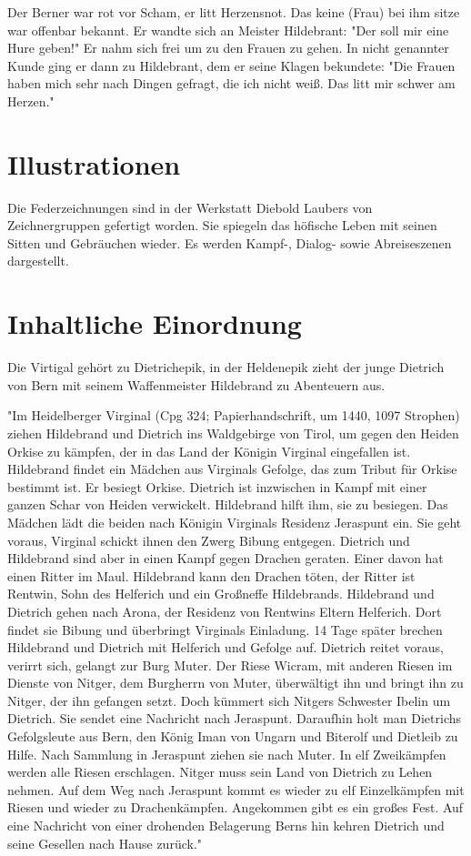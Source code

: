 \documentclass[a4paper, 12pt, oneside]{scrbook}
\begin{document}
Der Berner war rot vor Scham, er litt Herzensnot. Das keine (Frau) bei ihm sitze war offenbar bekannt. Er wandte sich an Meister Hildebrant: "Der soll mir eine Hure geben!" Er nahm sich frei um zu den Frauen zu gehen. In nicht genannter Kunde ging er dann zu Hildebrant, dem er seine Klagen bekundete: "Die Frauen haben mich sehr nach Dingen gefragt, die ich nicht weiß. Das litt mir schwer am Herzen."\cite{wiki_bernerton}

\section{Illustrationen}
Die Federzeichnungen sind in der Werkstatt Diebold Laubers von Zeichnergruppen gefertigt worden. Sie spiegeln das höfische Leben mit seinen Sitten und Gebräuchen wieder. Es werden Kampf-, Dialog- sowie Abreiseszenen dargestellt.\cite{ubheidelber_bibpal}

\section{Inhaltliche Einordnung}
Die Virtigal gehört zu Dietrichepik, in der Heldenepik zieht der junge Dietrich von Bern mit seinem Waffenmeister Hildebrand zu Abenteuern aus. 

"Im Heidelberger Virginal (Cpg 324; Papierhandschrift, um 1440, 1097 Strophen) ziehen Hildebrand und Dietrich ins Waldgebirge von Tirol, um gegen den Heiden Orkise zu kämpfen, der in das Land der Königin Virginal eingefallen ist. Hildebrand findet ein Mädchen aus Virginals Gefolge, das zum Tribut für Orkise bestimmt ist. Er besiegt Orkise. Dietrich ist inzwischen in Kampf mit einer ganzen Schar von Heiden verwickelt. Hildebrand hilft ihm, sie zu besiegen. Das Mädchen lädt die beiden nach Königin Virginals Residenz Jeraspunt ein. Sie geht voraus, Virginal schickt ihnen den Zwerg Bibung entgegen. Dietrich und Hildebrand sind aber in einen Kampf gegen Drachen geraten. Einer davon hat einen Ritter im Maul. Hildebrand kann den Drachen töten, der Ritter ist Rentwin, Sohn des Helferich und ein Großneffe Hildebrands. Hildebrand und Dietrich gehen nach Arona, der Residenz von Rentwins Eltern Helferich. Dort findet sie Bibung und überbringt Virginals Einladung. 14 Tage später brechen Hildebrand und Dietrich mit Helferich und Gefolge auf. Dietrich reitet voraus, verirrt sich, gelangt zur Burg Muter. Der Riese Wicram, mit anderen Riesen im Dienste von Nitger, dem Burgherrn von Muter, überwältigt ihn und bringt ihn zu Nitger, der ihn gefangen setzt. Doch kümmert sich Nitgers Schwester Ibelin um Dietrich. Sie sendet eine Nachricht nach Jeraspunt. Daraufhin holt man Dietrichs Gefolgsleute aus Bern, den König Iman von Ungarn und Biterolf und Dietleib zu Hilfe. Nach Sammlung in Jeraspunt ziehen sie nach Muter. In elf Zweikämpfen werden alle Riesen erschlagen. Nitger muss sein Land von Dietrich zu Lehen nehmen. Auf dem Weg nach Jeraspunt kommt es wieder zu elf Einzelkämpfen mit Riesen und wieder zu Drachenkämpfen. Angekommen gibt es ein großes Fest. Auf eine Nachricht von einer drohenden Belagerung Berns hin kehren Dietrich und seine Gesellen nach Hause zurück."\cite{wiki_virginal}
\end{document}
